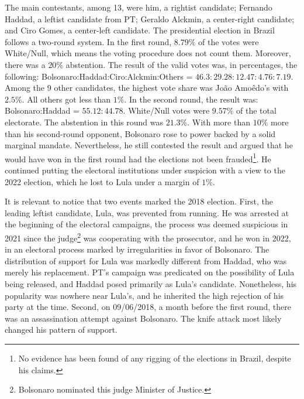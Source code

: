\documentclass[hidelinks,11pt]{article}
\begin{document}
The main contestants, among 13, were him, a rightist candidate; Fernando Haddad,
a leftist candidate from PT; Geraldo Alckmin, a center-right candidate; and Ciro
Gomes, a center-left candidate. The presidential election in Brazil follows a
two-round system. In the first round, \(8.79\%\) of the votes were White/Null,
which means the voting procedure does not count them. Moreover, there was a
\(20\%\) abstention. The result of the valid votes was, in percentages, the
following: Bolsonaro:Haddad:Ciro:Alckmin:Others =
\(46.3:29.28:12.47:4.76:7.19 \). Among the 9 other candidates, the highest vote
share was Jo{\~a}o Amo{\^e}do's with \(2.5\%\). All others got less than
\(1\%\). In the second round, the result was: Bolsonaro:Haddad =
\(55.12 : 44.78 \). White/Null votes were \(9.57\%\) of the total electorate.
The abstention in this round was \(21.3\%\). With more than \(10\%\) more than
his second-round opponent, Bolsonaro rose to power backed by a solid marginal
mandate. Nevertheless, he still contested the result and argued that he would
have won in the first round had the elections not been frauded\footnote{No
  evidence has been found of any rigging of the elections in Brazil, despite his
  claims.}. He continued putting the electoral institutions under suspicion with
a view to the 2022 election, which he lost to Lula under a margin of \(1\%\).


It is relevant to notice that two events marked the 2018 election. First, the
leading leftist candidate, Lula, was prevented from running. He was arrested at
the beginning of the electoral campaigns, the process was deemed suspicious in
2021 since the judge\footnote{Bolsonaro nominated this judge Minister of
Justice.} was cooperating with the prosecutor, and he won in 2022, in an
electoral process marked by irregularities in favor of Bolsonaro. The
distribution of support for Lula was markedly different from Haddad, who was
merely his replacement. PT's campaign was predicated on the possibility of Lula
being released, and Haddad posed primarily as Lula's candidate. Nonetheless, his
popularity was nowhere near Lula's, and he inherited the high rejection of his
party at the time. Second, on 09/06/2018, a month before the first round, there
was an assassination attempt against Bolsonaro. The knife attack most likely
changed his pattern of support.
\end{document}
